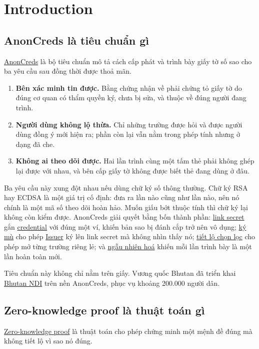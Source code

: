 \documentclass[a4paper,11pt,oneside]{report}
\theoremstyle{definition}
\theoremstyle{plain}
\newcommand{\g}[2]{\hyperref[term:#1]{#2}}
\begin{document}
\chapter{Introduction}

\section{AnonCreds là tiêu chuẩn gì}

\g{anoncreds}{AnonCreds} là bộ tiêu chuẩn mô tả cách cấp phát và trình bày giấy tờ số sao cho ba
yêu cầu sau đồng thời được thoả mãn.

\begin{enumerate}[leftmargin=1.5em,itemsep=5pt]
  \item \textbf{Bên xác minh tin được.} Bằng chứng nhận về phải chứng tỏ giấy tờ do đúng cơ quan
        có thẩm quyền ký, chưa bị sửa, và thuộc về đúng người đang trình.
  \item \textbf{Người dùng không lộ thừa.} Chỉ những trường được hỏi và được người dùng đồng ý
        mới hiện ra; phần còn lại vẫn nằm trong phép tính nhưng ở dạng đã che.
  \item \textbf{Không ai theo dõi được.} Hai lần trình cùng một tấm thẻ phải không ghép lại được
        với nhau, và bên cấp giấy tờ không được biết thẻ đang dùng ở đâu.
\end{enumerate}

Ba yêu cầu này xung đột nhau nếu dùng chữ ký số thông thường. Chữ ký RSA hay ECDSA là một giá trị
cố định: đưa ra lần nào cũng như lần nào, nên nó chính là một mã số theo dõi hoàn hảo. Muốn giấu
bớt thuộc tính thì chữ ký lại không còn kiểm được. AnonCreds giải quyết bằng bốn thành phần:
\g{linksecret}{link secret} gắn \g{credential}{credential} với đúng một ví, khiến bản sao bị đánh
cắp trở nên vô dụng; \g{blindsign}{ký mù} cho phép \g{issuer}{Issuer} ký lên link secret mà không
nhìn thấy nó; \g{selective}{tiết lộ chọn lọc} cho phép mở từng trường riêng lẻ; và
\g{rerand}{ngẫu nhiên hoá} khiến mỗi lần trình bày là một lần hoàn toàn mới.

Tiêu chuẩn này không chỉ nằm trên giấy. Vương quốc Bhutan đã triển khai \g{ndi}{Bhutan NDI} trên
nền AnonCreds, phục vụ khoảng 200.000 người dân.

\section{Zero-knowledge proof là thuật toán gì}

\g{zkp}{Zero-knowledge proof} là thuật toán cho phép chứng minh một mệnh đề đúng mà không tiết lộ
vì sao nó đúng.
\end{document}
